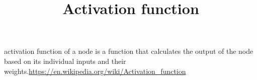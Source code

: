 \documentclass[a4paper]{article}
\title{Activation function}
\date{}
\begin{document}
    \maketitle
    
    activation function of a node is a function that calculates the output of the node based on its individual inputs and their weights.\url{https://en.wikipedia.org/wiki/Activation_function}
\end{document}
